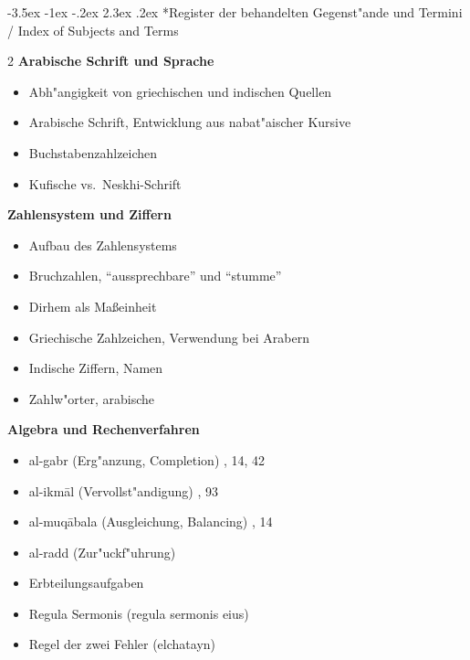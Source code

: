 \documentclass[10pt,a4paper]{article}
\makeatletter
\renewcommand{\section}{\@startsection{section}{1}{\z@}%
  {-3.5ex \@plus -1ex \@minus -.2ex}%
  {2.3ex \@plus .2ex}%
  {\normalfont\Large\bfseries\color{sectioncolor}}}
\newcommand{\enquote}[1]{``#1''}
\makeatother
\begin{document}
\section*{Register der behandelten Gegenst"ande und Termini / Index of Subjects and Terms}

\begin{paracol}{2}
\textbf{Arabische Schrift und Sprache}
\begin{itemize}[noitemsep]
\item Abh"angigkeit von griechischen und indischen Quellen 
\item Arabische Schrift, Entwicklung aus nabat"aischer Kursive 
\item Buchstabenzahlzeichen 
\item Kufische vs.\ Neskhi-Schrift 
\end{itemize}

\textbf{Zahlensystem und Ziffern}
\begin{itemize}[noitemsep]
\item Aufbau des Zahlensystems 
\item Bruchzahlen, \enquote{aussprechbare} und \enquote{stumme} 
\item Dirhem als Ma\ss{}einheit 
\item Griechische Zahlzeichen, Verwendung bei Arabern 
\item Indische Ziffern, Namen 
\item Zahlw"orter, arabische 
\end{itemize}

\textbf{Algebra und Rechenverfahren}
\begin{itemize}[noitemsep]
\item al-gabr (Erg"anzung, Completion) , 14, 42
\item al-ikm\=al (Vervollst"andigung) , 93
\item al-muq\=abala (Ausgleichung, Balancing) , 14
\item al-radd (Zur"uckf"uhrung) 
\item Erbteilungsaufgaben 
\item Regula Sermonis (regula sermonis eius) 
\item Regel der zwei Fehler (elchatayn) 
\end{itemize}


\end{paracol}
\end{document}
